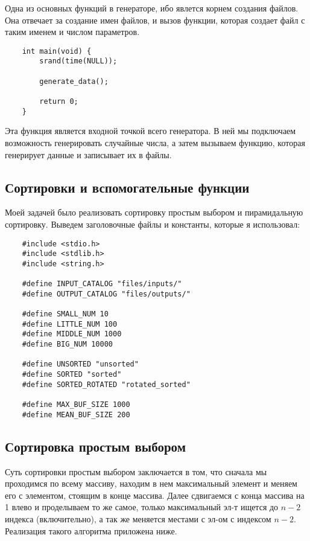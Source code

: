 \documentclass[a4paper,12pt,titlepage,finall]{article}
\begin{document}
Одна из основных функций в генераторе, ибо явлется корнем создания файлов.
Она отвечает за создание имен файлов, и вызов функции, которая создает файл с таким именем и числом параметров.

\begin{verbatim}
    int main(void) {
        srand(time(NULL));

        generate_data();

        return 0;
    }
\end{verbatim}

Эта функция является входной точкой всего генератора.
В ней мы подключаем возможность генерировать случайные числа,
а затем вызываем функцию, которая генерирует данные и записывает их в файлы.

\newpage

\subsection{Сортировки и вспомогательные функции}

Моей задачей было реализовать сортировку простым выбором и пирамидальную сортировку.
Выведем заголовочные файлы и константы, которые я использовал:
\begin{verbatim}
    #include <stdio.h>
    #include <stdlib.h>
    #include <string.h>
    
    #define INPUT_CATALOG "files/inputs/"
    #define OUTPUT_CATALOG "files/outputs/"
    
    #define SMALL_NUM 10
    #define LITTLE_NUM 100
    #define MIDDLE_NUM 1000
    #define BIG_NUM 10000
    
    #define UNSORTED "unsorted"
    #define SORTED "sorted"
    #define SORTED_ROTATED "rotated_sorted"
    
    #define MAX_BUF_SIZE 1000
    #define MEAN_BUF_SIZE 200
\end{verbatim}

\subsection{Сортировка простым выбором}

Суть сортировки простым выбором заключается в том, что сначала мы проходимся по всему массиву, находим
в нем максимальный элемент и меняем его с элементом, стоящим в конце массива. Далее сдвигаемся с конца массива на 1 влево
и проделываем то же самое, только максимальный эл-т ищется до $n - 2$ индекса (включительно),
а так же меняется местами с эл-ом с индексом $n - 2$. Реализация такого алгоритма приложена ниже.
\end{document}

